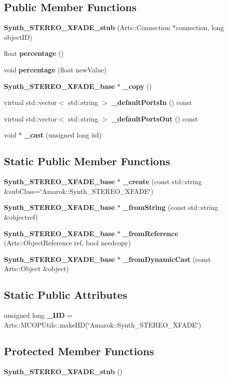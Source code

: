 \subsection*{Public Member Functions}
\begin{CompactItemize}
\item 
{\bf Synth\_\-STEREO\_\-XFADE\_\-stub} (Arts::Connection $\ast$connection, long object\-ID)
\item 
float {\bf percentage} ()
\item 
void {\bf percentage} (float new\-Value)
\item 
{\bf Synth\_\-STEREO\_\-XFADE\_\-base} $\ast$ {\bf \_\-copy} ()
\item 
virtual std::vector$<$ std::string $>$ {\bf \_\-default\-Ports\-In} () const 
\item 
virtual std::vector$<$ std::string $>$ {\bf \_\-default\-Ports\-Out} () const 
\item 
void $\ast$ {\bf \_\-cast} (unsigned long iid)
\end{CompactItemize}
\subsection*{Static Public Member Functions}
\begin{CompactItemize}
\item 
{\bf Synth\_\-STEREO\_\-XFADE\_\-base} $\ast$ {\bf \_\-create} (const std::string \&sub\-Class=\char`\"{}Amarok::Synth\_\-STEREO\_\-XFADE\char`\"{})
\item 
{\bf Synth\_\-STEREO\_\-XFADE\_\-base} $\ast$ {\bf \_\-from\-String} (const std::string \&objectref)
\item 
{\bf Synth\_\-STEREO\_\-XFADE\_\-base} $\ast$ {\bf \_\-from\-Reference} (Arts::Object\-Reference ref, bool needcopy)
\item 
{\bf Synth\_\-STEREO\_\-XFADE\_\-base} $\ast$ {\bf \_\-from\-Dynamic\-Cast} (const Arts::Object \&object)
\end{CompactItemize}
\subsection*{Static Public Attributes}
\begin{CompactItemize}
\item 
unsigned long {\bf \_\-IID} = Arts::MCOPUtils::make\-IID(\char`\"{}Amarok::Synth\_\-STEREO\_\-XFADE\char`\"{})
\end{CompactItemize}
\subsection*{Protected Member Functions}
\begin{CompactItemize}
\item 
{\bf Synth\_\-STEREO\_\-XFADE\_\-stub} ()
\end{CompactItemize}


